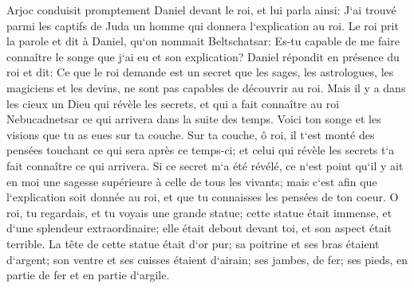 \verse Arjoc conduisit promptement Daniel devant le roi, et lui parla ainsi: J`ai trouvé parmi les captifs de Juda un homme qui donnera l`explication au roi. 
\verse Le roi prit la parole et dit à Daniel, qu`on nommait Beltschatsar: Es-tu capable de me faire connaître le songe que j`ai eu et son explication? 
\verse Daniel répondit en présence du roi et dit: Ce que le roi demande est un secret que les sages, les astrologues, les magiciens et les devins, ne sont pas capables de découvrir au roi. 
\verse Mais il y a dans les cieux un Dieu qui révèle les secrets, et qui a fait connaître au roi Nebucadnetsar ce qui arrivera dans la suite des temps. Voici ton songe et les visions que tu as eues sur ta couche. 
\verse Sur ta couche, ô roi, il t`est monté des pensées touchant ce qui sera après ce temps-ci; et celui qui révèle les secrets t`a fait connaître ce qui arrivera. 
\verse Si ce secret m`a été révélé, ce n`est point qu`il y ait en moi une sagesse supérieure à celle de tous les vivants; mais c`est afin que l`explication soit donnée au roi, et que tu connaisses les pensées de ton coeur. 
\verse O roi, tu regardais, et tu voyais une grande statue; cette statue était immense, et d`une splendeur extraordinaire; elle était debout devant toi, et son aspect était terrible. 
\verse La tête de cette statue était d`or pur; sa poitrine et ses bras étaient d`argent; son ventre et ses cuisses étaient d`airain; 
\verse ses jambes, de fer; ses pieds, en partie de fer et en partie d`argile. 
